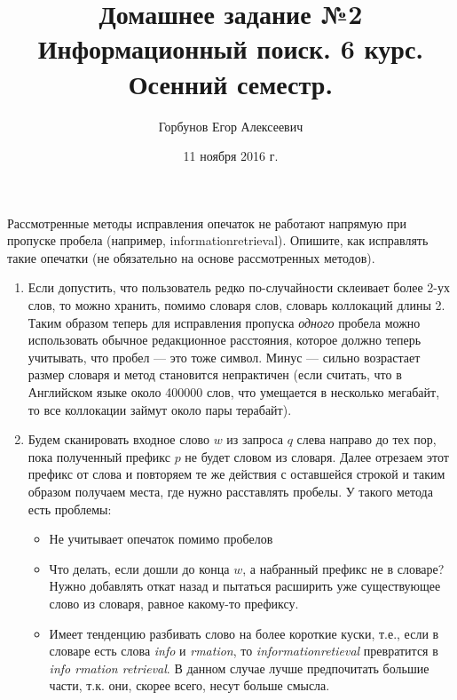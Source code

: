 


\title{Домашнее задание №2 \\ Информационный поиск. 6 курс. Осенний семестр.}
\author{Горбунов Егор Алексеевич}
\date{11 ноября 2016 г.}

\maketitle

\begin{task}[1]
Рассмотренные методы исправления опечаток не работают напрямую при
пропуске пробела (например, informationretrieval). Опишите, как исправлять такие
опечатки (не обязательно на основе рассмотренных методов).
\end{task}
\begin{solution}
\begin{enumerate}
	\item Если допустить, что пользователь редко по-случайности склеивает более 2-ух слов, то можно хранить, помимо словаря слов, словарь коллокаций длины 2. Таким образом теперь для исправления пропуска \emph{одного} пробела можно использовать обычное редакционное расстояния, которое должно теперь учитывать, что пробел --- это тоже символ. Минус --- сильно возрастает размер словаря и метод становится непрактичен (если считать, что в Английском языке около 400000 слов, что умещается в несколько мегабайт, то все коллокации займут около пары терабайт).
	\item Будем сканировать входное слово $w$ из запроса $q$ слева направо до тех пор, пока полученный префикс $p$ не будет словом из словаря. Далее отрезаем этот префикс от слова и повторяем те же действия с оставшейся строкой и таким образом получаем места, где нужно расставлять пробелы. У такого метода есть проблемы:
	\begin{itemize}
		\item Не учитывает опечаток помимо пробелов
		\item Что делать, если дошли до конца $w$, а набранный префикс не в словаре? Нужно добавлять откат назад и пытаться расширить уже существующее слово из словаря, равное какому-то префиксу.
		\item Имеет тенденцию разбивать слово на более короткие куски, т.е., если в словаре есть слова \emph{info} и \emph{rmation}, то \emph{informationretieval} превратится в \emph{info rmation retrieval}. В данном случае лучше предпочитать большие части, т.к. они, скорее всего, несут больше смысла.

\end{itemize}
\end{enumerate}
\end{solution}
